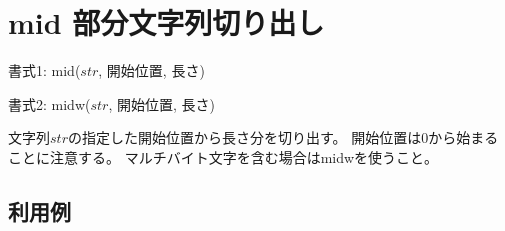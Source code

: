 
%

\section{mid 部分文字列切り出し\label{sect:mid}}

書式1: mid($str$, 開始位置, 長さ)

書式2: midw($str$, 開始位置, 長さ)

文字列$str$の指定した開始位置から長さ分を切り出す。
開始位置は0から始まることに注意する。
マルチバイト文字を含む場合はmidwを使うこと。

\subsection*{利用例}


%


